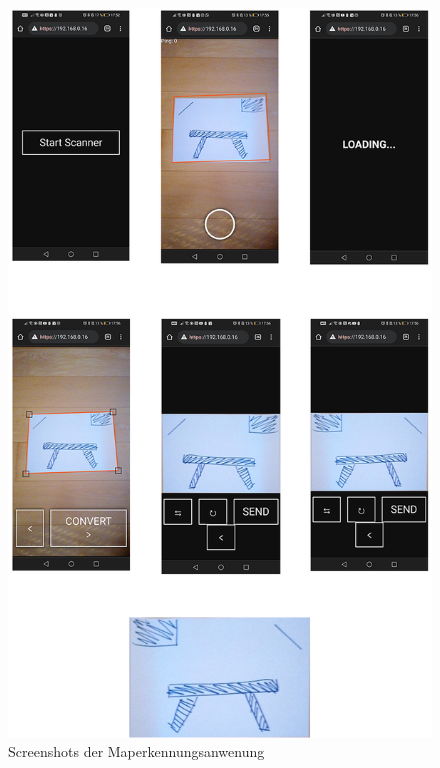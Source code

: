 \begin{figure}[H]
    \centering
    \includegraphics[scale=0.4]{pics/demo_maperkennung/sammlung_1.png}
    \caption{Screenshots der Maperkennungsanwenung}
    \label{fig:map:maperkennungsprozess}
\end{figure}

